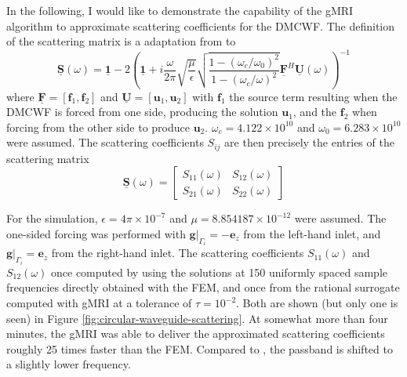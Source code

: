 \documentclass[11pt, a4paper]{article}
\begin{document}
In the following, I would like to demonstrate the capability of the 
\acrshort{gMRI} algorithm to approximate scattering coefficients for the \acrshort{DMCWF}.
The definition of the scattering matrix is a adaptation from \cite{shortMRI} to
\begin{equation}
    \mathbf{\underline{S}}(\omega) = \mathbf{\underline{1}}
    - 2\left( \mathbf{\underline{1}} + i \frac{\omega}{2\pi} \sqrt{\frac{\mu}{\epsilon}}
    \sqrt{\frac{1 - (\omega_c / \omega_0)^2}{1 - (\omega_c / \omega)^2}} 
    \mathbf{\underline{F}}^H \mathbf{\underline{U}}(\omega) \right)^{-1}
\end{equation}
where $\mathbf{\underline{F}} = [\mathbf{f}_1, \mathbf{f}_2]$ and
$\mathbf{\underline{U}} = [\mathbf{u}_1, \mathbf{u}_2]$ with $\mathbf{f}_1$ the source term
resulting when the \acrshort{DMCWF} is forced from one side, producing the
solution $\mathbf{u}_1$, and the $\mathbf{f}_2$ when forcing from the other side to
produce $\mathbf{u}_2$. $\omega_c = 4.122 \times 10^{10}$ and $\omega_0 = 6.283 \times 10^{10}$
were assumed. The scattering coefficients $S_{ij}$ are then precisely the
entries of the scattering matrix
\begin{equation}
    \mathbf{\underline{S}}(\omega) =
    \begin{bmatrix}
            S_{11}(\omega) & S_{12}(\omega) \\
            S_{21}(\omega) & S_{22}(\omega)
    \end{bmatrix}\label{equ:scattering-coefficients}
\end{equation}

For the simulation, $\epsilon = 4 \pi \times 10^{-7}$ and 
$\mu = 8.854187 \times 10^{-12}$ were assumed. The one-sided forcing
was performed with $\left.\mathbf{g}\right|_{\Gamma_i} = - \mathbf{e}_z$ from the
left-hand inlet, and $\left.\mathbf{g}\right|_{\Gamma_i} = \mathbf{e}_z$ from the
right-hand inlet. The scattering coefficients $S_{11}(\omega)$ and $S_{12}(\omega)$
once computed by using the solutions at 150 uniformly spaced sample frequencies
directly obtained with the \acrshort{FEM},
and once from the rational surrogate computed with \acrshort{gMRI} at a tolerance
of $\tau = 10^{-2}$. Both are shown (but only one is seen) in Figure
\ref{fig:circular-waveguide-scattering}. At somewhat more than four minutes,
the \acrshort{gMRI} was able to deliver the approximated scattering coefficients
roughly 25 times faster than the \acrshort{FEM}. Compared to \cite{DMCWF-FrequencySweep},
the passband is shifted to a slightly lower frequency.
\end{document}
